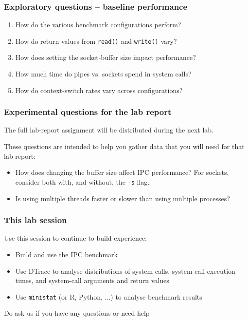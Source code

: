 \begin{frame}
  \frametitle{Exploratory questions -- baseline performance}

  \begin{enumerate}
    \item How do the various benchmark configurations perform?
    \item How do return values from \texttt{read()} and \texttt{write()} vary?
    \item How does setting the socket-buffer size impact performance?
    \item How much time do pipes vs. sockets spend in system calls?
    \item How do context-switch rates vary across configurations?
  \end{enumerate}
\end{frame}

\begin{frame}
  \frametitle{Experimental questions for the lab report}

  The full lab-report assignment will be distributed during the next lab.

  \medskip

  These questions are intended to help you gather data that you will need for
  that lab report:

  \begin{itemize}
    \item How does changing the buffer size affect IPC performance?
      For sockets, consider both with, and without, the \texttt{-s} flag.

    \item Is using multiple threads faster or slower than using multiple
      processes?
  \end{itemize}
\end{frame}

\begin{frame}
  \frametitle{This lab session}

  Use this session to continue to build experience:

  \begin{itemize}
    \item Build and use the IPC benchmark
    \item Use DTrace to analyse distributions of system calls, system-call
      execution times, and system-call arguments and return values
    \item Use \texttt{ministat} (or R, Python, ...) to analyse benchmark results
  \end{itemize}

  Do ask us if you have any questions or need help
\end{frame}


